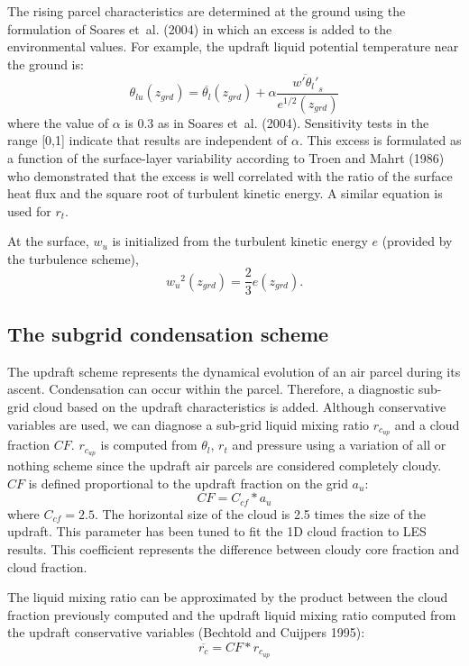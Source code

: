 The rising parcel characteristics are determined at the ground using the formulation of Soares et~al. (2004) in which an excess is added to the environmental values. For example, the updraft liquid potential temperature near the ground is:
\begin{equation}
\theta_{lu}(z_{grd})=\overline{\theta_l}(z_{grd})+\alpha\frac{{\overline{w'\theta_l'}}_s}{e^{1/2}(z_{grd})}
\label{eq:Phiz0}
\end{equation}
where the value of $\alpha$ is $0.3$ as in Soares et~al. (2004). Sensitivity tests in the range [0,1] indicate that results are independent of $\alpha$. This excess is formulated as a function of the surface-layer variability according to Troen and Mahrt (1986) who demonstrated that the excess is well correlated with the ratio of the surface heat flux and the square root of turbulent kinetic energy. A similar equation is used for $r_t$. 

At the surface, $w_u$ is initialized from the turbulent kinetic energy $e$ (provided by the turbulence scheme),
\begin{equation}
  {w_u}^2(z_{grd})=\frac{2}{3}e(z_{grd}).
  \label{Wz0}
\end{equation}

\subsection{The subgrid condensation scheme}

The updraft scheme represents the dynamical evolution of an air parcel during its ascent. Condensation can occur within the parcel. Therefore, a diagnostic sub-grid cloud based on the updraft characteristics is added. Although conservative variables are used, we can diagnose a sub-grid liquid mixing ratio $r_{c_{up}}$ and a cloud fraction $CF$. $r_{c_{up}}$ is computed from $\theta_l$, $r_t$ and pressure using a variation of all or nothing scheme since the updraft air parcels are considered completely cloudy.
$CF$ is defined proportional to the updraft fraction on the grid $a_u$:
\begin{equation}
  CF=C_{cf} * a_u
  \label{eq:CloudFrac}
\end{equation}
where $C_{cf}=2.5$. The horizontal size of the cloud is 2.5 times the size of the updraft. This parameter has been tuned to fit the 1D cloud fraction to LES results. This coefficient represents the difference between cloudy core fraction and cloud fraction.

The liquid mixing ratio can be approximated by the product between the cloud fraction previously computed and the updraft liquid mixing ratio computed from the updraft conservative variables (Bechtold and Cuijpers 1995):
\begin{equation}
  \overline{r_c}= CF * r_{c_{up}}
\label{eq:RcFrac}
\end{equation}

